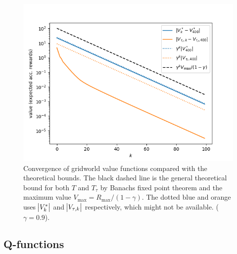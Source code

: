 \begin{example}[Gridworld]
  \begin{figure}[H]
    \centering
    \includegraphics[scale=0.7]{figs/gridworld2.png}
    \caption{Convergence of gridworld value functions compared with
      the theoretical bounds. The black dashed line is the general theoretical
      bound for both $T$ and $T_{\tau}$ by Banachs fixed point theorem and
      the maximum value $V_{\max} = R_{\max} / (1-\gamma)$.
      The dotted blue and orange uses $\abs{V_k^*}$ and $\abs{V_{\tau, k}}$ 
      respectively, which might not be available.
    ($\gamma = 0.9$).}
    \label{fig:gw2}
  \end{figure}

  \label{ex:gridworld}
\end{example}

\subsection{Q-functions}

